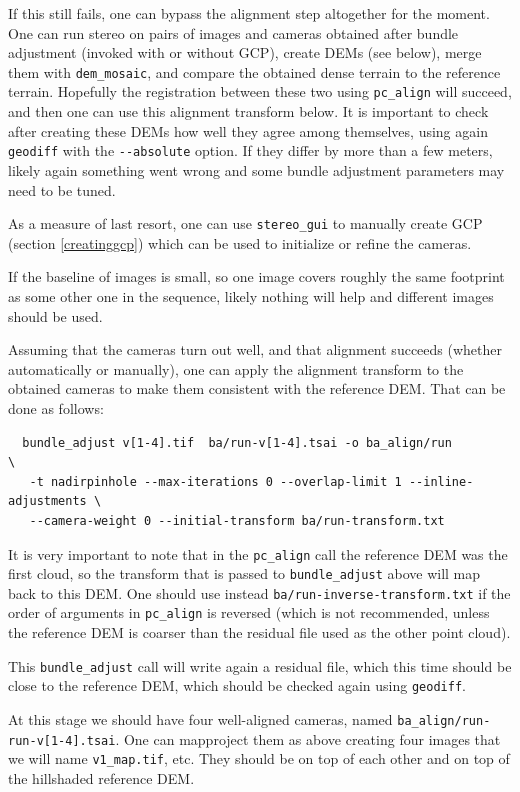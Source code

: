 If this still fails, one can bypass the alignment step altogether for
the moment. One can run stereo on pairs of images and cameras obtained
after bundle adjustment (invoked with or without GCP), create DEMs (see
below), merge them with \texttt{dem\_mosaic}, and compare the obtained
dense terrain to the reference terrain. Hopefully the registration
between these two using \texttt{pc\_align} will succeed, and then one
can use this alignment transform below. It is important to check after
creating these DEMs how well they agree among themselves, using again
\texttt{geodiff} with the \texttt{-\/-absolute} option. If they differ
by more than a few meters, likely again something went wrong and some
bundle adjustment parameters may need to be tuned. 

As a measure of last resort, one can use \texttt{stereo\_gui} to manually
create GCP (section \ref{creatinggcp}) which can be used to initialize
or refine the cameras.

If the baseline of images is small, so one image covers roughly the same
footprint as some other one in the sequence, likely nothing will help
and different images should be used.

Assuming that the cameras turn out well, and that alignment succeeds
(whether automatically or manually), one can apply the alignment
transform to the obtained cameras to make them consistent with the
reference DEM. That can be done as follows:

\begin{verbatim}
  bundle_adjust v[1-4].tif  ba/run-v[1-4].tsai -o ba_align/run               \
   -t nadirpinhole --max-iterations 0 --overlap-limit 1 --inline-adjustments \
   --camera-weight 0 --initial-transform ba/run-transform.txt
\end{verbatim}

It is very important to note that in the \texttt{pc\_align} call the reference
DEM was the first cloud, so the transform that is passed
to \texttt{bundle\_adjust} above will map back to this DEM. One
should use instead \texttt{ba/run-inverse-transform.txt}
if the order of arguments in \texttt{pc\_align} is reversed (which is not recommended,
unless the reference DEM is coarser than the residual file used as the other point cloud).
 
This \texttt{bundle\_adjust} call will write again a residual file,
which this time should be close to the reference DEM, which should be
checked again using \texttt{geodiff}.

At this stage we should have four well-aligned cameras, named
\texttt{ba\_align/run-run-v[1-4].tsai}. 
One can mapproject them as above creating four images
that we will name \texttt{v1\_map.tif}, etc. They should be on top of each other
and on top of the hillshaded reference DEM.

